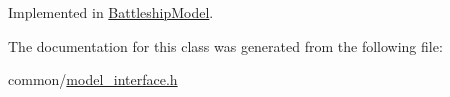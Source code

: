 Implemented in \hyperlink{classMODEL_1_1BattleshipModel_a655da28525f6ac4d2d15da6808c538b9}{Battleship\+Model}.



The documentation for this class was generated from the following file\+:\begin{DoxyCompactItemize}
\item 
common/\hyperlink{model__interface_8h}{model\+\_\+interface.\+h}\end{DoxyCompactItemize}
